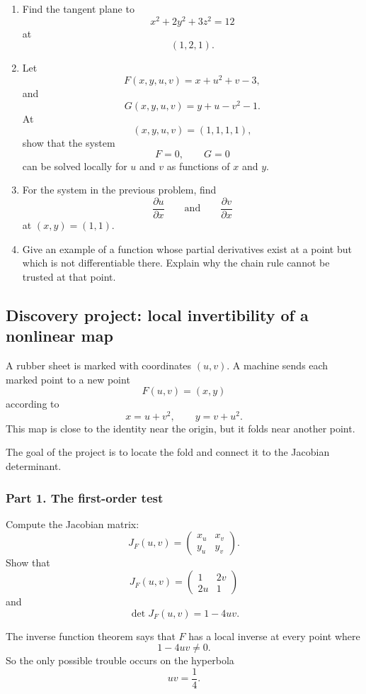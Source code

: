 \begin{enumerate}
\item Find the tangent plane to
\[
    x^2+2y^2+3z^2=12
\]
at
\[
    (1,2,1).
\]

\item Let
\[
    F(x,y,u,v)=x+u^2+v-3,
\]
and
\[
    G(x,y,u,v)=y+u-v^2-1.
\]
At
\[
    (x,y,u,v)=(1,1,1,1),
\]
show that the system
\[
    F=0,\qquad G=0
\]
can be solved locally for \(u\) and \(v\) as functions of \(x\) and \(y\).

\item For the system in the previous problem, find
\[
    \frac{\partial u}{\partial x}
    \qquad\text{and}\qquad
    \frac{\partial v}{\partial x}
\]
at \((x,y)=(1,1)\).

\item Give an example of a function whose partial derivatives exist at a point but which
is not differentiable there.  Explain why the chain rule cannot be trusted at that point.
\end{enumerate}

\subsection{Discovery project: local invertibility of a nonlinear map}

A rubber sheet is marked with coordinates \((u,v)\).  A machine sends each marked
point to a new point
\[
    F(u,v)=(x,y)
\]
according to
\[
\boxed{
    x=u+v^2,\qquad y=v+u^2.
}
\]
This map is close to the identity near the origin, but it folds near another point.

The goal of the project is to locate the fold and connect it to the Jacobian determinant.

\subsubsection*{Part 1. The first-order test}

Compute the Jacobian matrix:
\[
    J_F(u,v)=
    \begin{pmatrix}
        x_u & x_v\\
        y_u & y_v
    \end{pmatrix}.
\]
Show that
\[
\boxed{
    J_F(u,v)=
    \begin{pmatrix}
        1 & 2v\\
        2u & 1
    \end{pmatrix}
}
\]
and
\[
\boxed{
    \det J_F(u,v)=1-4uv.
}
\]

The inverse function theorem says that \(F\) has a local inverse at every point where
\[
    1-4uv\ne0.
\]
So the only possible trouble occurs on the hyperbola
\[
    uv=\frac14.
\]

